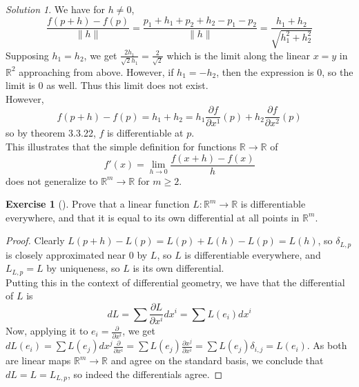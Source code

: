 \documentclass[reqno]{amsart}
\theoremstyle{plain}%
\theoremstyle{definition}
\newtheorem{exercise}[theorem]{Exercise}
\theoremstyle{remark}
\newtheorem*{solution}{Solution}
\begin{document}
    \begin{solution}
        We have for $h\neq 0$,
        \[
        \frac{f\left( p+h \right) -f(p)}{\|h\|}
        = \frac{p_1 + h_1 + p_2 + h_2 - p_1 - p_2}{\|h\|}
        = \frac{h_1 + h_2}{\sqrt{h_1^2 + h_2^2} }
        \] 
        Supposing $h_1 = h_2$, we get
        $\frac{2 h_1}{\sqrt{2} h_1} = \frac{2}{\sqrt{2} }$ which is the
        limit along the linear $x=y$ in $\mathbb{R}^2$ approaching from
        above. However, if $h_1 = -h_2$, then
        the expression is $0$, so the limit is $0$ as well. Thus
        this limit does not exist.\\
        However, 
        \[
        f(p+h) - f(p) = h_1 + h_2
        = h_1 \frac{\partial f}{\partial x^{1}} (p) + 
        h_2 \frac{\partial f}{\partial x^{2}} (p)
        \] 
        so by theorem 3.3.22, $f$ is differentiable at
        $p$.\\
        This illustrates that the simple definition for functions
         $\mathbb{R} \to \mathbb{R}$ of
         \[
         f'(x)= \lim_{h\to 0} \frac{f(x+h) - f(x)}{h}
         \] 
         does not generalize to $\mathbb{R}^{m} \to \mathbb{R}$ for
         $m\ge 2$. 
    \end{solution}

    \begin{exercise}[]
        Prove that a linear function $L  \colon \mathbb{R}^{m} \to \mathbb{R}$ 
        is differentiable everywhere, and that it is equal to its own 
        differential at all points in $\mathbb{R}^{m}$.
    \end{exercise}

    \begin{proof}
        Clearly $L(p+h) - L(p) = L(p) + L(h) - L(p) = L(h)$, so
        $\delta_{L,p}$ is closely approximated near $0$ by
        $L$, so $L$ is differentiable everywhere, and
        $L_{L,p} = L$ by uniqueness, so $L$ is its own differential.\\
        Putting this in the context of differential geometry, we have
        that the differential of $L$ is
        \[
        dL = \sum \frac{\partial L}{\partial x^{i}} d x^{i}
        = \sum L\left( e_i \right) dx^{i}
        \] 
        Now, applying it to $e_i = \frac{\partial }{\partial x^{i}} $,
        we get
        $dL(e_i) = \sum L(e_j) dx^{j} \frac{\partial }{\partial x^{i}} 
        = \sum L(e_j) \frac{\partial x^{j}}{\partial x^{i}} 
        = \sum L(e_j) \delta_{i,j}
        = L(e_i)$. As both are linear maps
        $\mathbb{R}^{m} \to \mathbb{R}$ and agree on the standard
        basis, we conclude that $dL = L = L_{L,p}$, so indeed
        the differentials agree.
    \end{proof}
\end{document}
